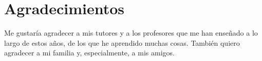 \chapter*{Agradecimientos}

Me gustaría agradecer a mis tutores y a los profesores que me han enseñado a lo largo de estos años, de los que he aprendido muchas cosas. También quiero agradecer a mi familia y, especialmente, a mis amigos.
